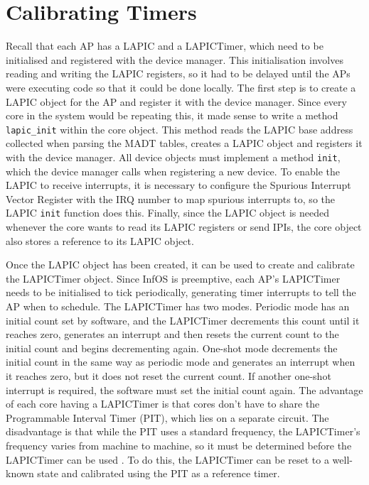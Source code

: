 \documentclass[bsc,frontabs,singlespacing,parskip,deptreport]{infthesis}
\begin{document}
\section{Calibrating Timers} \label{calibrating-timers}
Recall that each AP has a LAPIC and a LAPICTimer, which need to be initialised and registered with the device manager. This initialisation involves reading and writing the LAPIC registers, so it had to be delayed until the APs were executing code so that it could be done locally. The first step is to create a LAPIC object for the AP and register it with the device manager. Since every core in the system would be repeating this, it made sense to write a method \verb|lapic_init| within the core object. This method reads the LAPIC base address collected when parsing the MADT tables, creates a LAPIC object and registers it with the device manager. All device objects must implement a method \verb|init|, which the device manager calls when registering a new device. To enable the LAPIC to receive interrupts, it is necessary to configure the Spurious Interrupt Vector Register with the IRQ number to map spurious interrupts to, so the LAPIC \verb|init| function does this. Finally, since the LAPIC object is needed whenever the core wants to read its LAPIC registers or send IPIs, the core object also stores a reference to its LAPIC object. 

Once the LAPIC object has been created, it can be used to create and calibrate the LAPICTimer object. Since InfOS is preemptive, each AP's LAPICTimer needs to be initialised to tick periodically, generating timer interrupts to tell the AP when to schedule. The LAPICTimer has two modes. Periodic mode has an initial count set by software, and the LAPICTimer decrements this count until it reaches zero, generates an interrupt and then resets the current count to the initial count and begins decrementing again. One-shot mode decrements the initial count in the same way as periodic mode and generates an interrupt when it reaches zero, but it does not reset the current count. If another one-shot interrupt is required, the software must set the initial count again. The advantage of each core having a LAPICTimer is that cores don't have to share the Programmable Interval Timer (PIT), which lies on a separate circuit. The disadvantage is that while the PIT uses a standard frequency, the LAPICTimer's frequency varies from machine to machine, so it must be determined before the LAPICTimer can be used \cite{osdev-apic-timer}. To do this, the LAPICTimer can be reset to a well-known state and calibrated using the PIT as a reference timer. 
\end{document}
